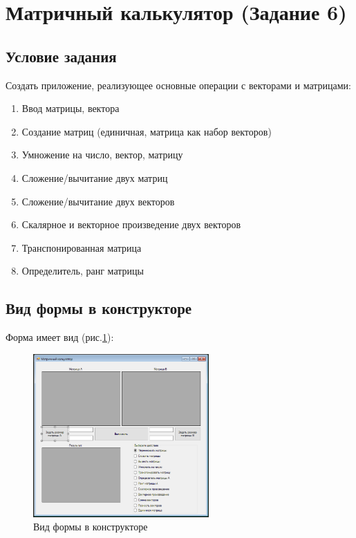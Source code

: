 \section{Матричный калькулятор (Задание 6)}

\subsection{Условие задания}

Создать приложение, реализующее основные операции с векторами и матрицами:

\begin{enumerate}
    \item{Ввод матрицы, вектора}
    \item{Создание матриц (единичная, матрица как набор векторов)}
    \item{Умножение на число, вектор, матрицу}
    \item{Сложение/вычитание двух матриц}
    \item{Сложение/вычитание двух векторов}
    \item{Скалярное и векторное произведение двух векторов}
    \item{Транспонированная матрица}
    \item{Определитель, ранг матрицы}
\end{enumerate}

\subsection{Вид формы в конструкторе}

Форма имеет вид (рис.\ref{fig:FormInConstruct6}):

\begin{figure}[!h]
    \centering
    \includegraphics[width = 0.6\textwidth]{images/Task6/FormInConstructor.png}
    \caption{Вид формы в конструкторе}
    \label{fig:FormInConstruct6}
\end{figure}

